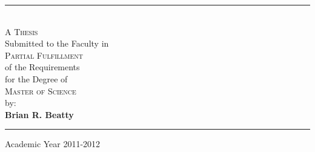 \begin{titlepage}
\begin{centering}
\end{centering}
\rule{\linewidth}{0.5mm}\vspace{0.3cm}
\begin{centering}\\
  {\small{\Large\scshape A Thesis}\\Submitted to the Faculty in\\{\Large\scshape Partial Fulfillment}\\of the Requirements\\
  	for the Degree of\\{\Large\scshape Master of Science}\\by:\\}
  \vspace*{0.5em}\textbf{\LARGE Brian R. Beatty}\vspace*{0.5em}
\rule{\linewidth}{0.5mm}

\end{centering}
\vspace*{0.5cm}
\begin{center}
  Academic Year 2011-2012
\end{center} \clearpage

\end{titlepage}